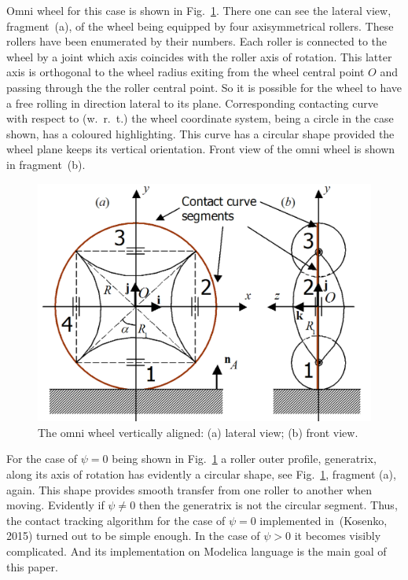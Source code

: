 \documentclass{jsme-tj}
\begin{document}
Omni wheel for this case is shown in Fig.~\ref{figure1}. There one can 
see the lateral view, fragment~(a), of the wheel being equipped by four 
axisymmetrical rollers. These rollers have been enumerated by their numbers. 
Each roller is connected to the wheel by a joint which axis coincides with the 
roller axis of rotation. This latter axis is orthogonal to the wheel radius 
exiting from the wheel central point $O$ and passing through the the roller 
central point. So it is possible for the wheel to have a free rolling in 
direction lateral to its plane. Corresponding contacting curve with respect to 
(w.~r.~t.) the wheel coordinate system, being a circle in the case shown, has a 
coloured highlighting. This curve has a circular shape provided the wheel plane 
keeps its vertical orientation. Front view of the omni wheel is shown in 
fragment~(b).

\begin{figure}[t]
\begin{center}
\includegraphics[bb= 0 0 19.50cm 16cm,scale=0.55]{OmniWheel.png}
\caption{The omni wheel vertically aligned: (a) lateral view; (b) front view.}
\end{center}
\label{figure1}
\end{figure}

For the case of $\psi =0$ being shown in Fig.~\ref{figure1} a roller outer 
profile, generatrix, along its axis of rotation has evidently a circular shape, 
see Fig.~\ref{figure1}, fragment (a), again. This shape provides smooth 
transfer from one roller to another when moving. Evidently if $\psi\ne 0$ then 
the generatrix is not the circular segment. Thus, the contact tracking 
algorithm for the case of $\psi =0$ implemented in~(Kosenko, 2015) turned out 
to be simple enough. In the case of $\psi >0$ it becomes visibly complicated. 
And its implementation on Modelica language is the main goal of this paper.
\end{document}

